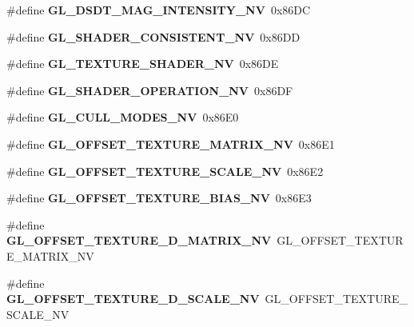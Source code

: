 \begin{DoxyCompactItemize}
\item 
\#define {\bfseries G\+L\+\_\+\+D\+S\+D\+T\+\_\+\+M\+A\+G\+\_\+\+I\+N\+T\+E\+N\+S\+I\+T\+Y\+\_\+\+N\+V}~0x86\+D\+C\label{_s_d_l__opengl_8h_a4ee6f5fea554ca6bdd4c64cc212633a6}

\item 
\#define {\bfseries G\+L\+\_\+\+S\+H\+A\+D\+E\+R\+\_\+\+C\+O\+N\+S\+I\+S\+T\+E\+N\+T\+\_\+\+N\+V}~0x86\+D\+D\label{_s_d_l__opengl_8h_a057a82389278a1d89e69858e8e22dcfa}

\item 
\#define {\bfseries G\+L\+\_\+\+T\+E\+X\+T\+U\+R\+E\+\_\+\+S\+H\+A\+D\+E\+R\+\_\+\+N\+V}~0x86\+D\+E\label{_s_d_l__opengl_8h_a53dd4e08237db42007aafcc639c83b33}

\item 
\#define {\bfseries G\+L\+\_\+\+S\+H\+A\+D\+E\+R\+\_\+\+O\+P\+E\+R\+A\+T\+I\+O\+N\+\_\+\+N\+V}~0x86\+D\+F\label{_s_d_l__opengl_8h_ae6e250a9d3b57ca1c7c3feade2f28899}

\item 
\#define {\bfseries G\+L\+\_\+\+C\+U\+L\+L\+\_\+\+M\+O\+D\+E\+S\+\_\+\+N\+V}~0x86\+E0\label{_s_d_l__opengl_8h_abe95e67754b4eb6a33d3303dcdea7814}

\item 
\#define {\bfseries G\+L\+\_\+\+O\+F\+F\+S\+E\+T\+\_\+\+T\+E\+X\+T\+U\+R\+E\+\_\+\+M\+A\+T\+R\+I\+X\+\_\+\+N\+V}~0x86\+E1\label{_s_d_l__opengl_8h_a4ef75b7d70365dc490a4cd3e5e6d979a}

\item 
\#define {\bfseries G\+L\+\_\+\+O\+F\+F\+S\+E\+T\+\_\+\+T\+E\+X\+T\+U\+R\+E\+\_\+\+S\+C\+A\+L\+E\+\_\+\+N\+V}~0x86\+E2\label{_s_d_l__opengl_8h_a9f16d4d5e18720bbf9f22f271f10f00f}

\item 
\#define {\bfseries G\+L\+\_\+\+O\+F\+F\+S\+E\+T\+\_\+\+T\+E\+X\+T\+U\+R\+E\+\_\+\+B\+I\+A\+S\+\_\+\+N\+V}~0x86\+E3\label{_s_d_l__opengl_8h_a5e6ec56fcbbceedb60992db867b63fe2}

\item 
\#define {\bfseries G\+L\+\_\+\+O\+F\+F\+S\+E\+T\+\_\+\+T\+E\+X\+T\+U\+R\+E\+\_\+D\+\_\+\+M\+A\+T\+R\+I\+X\+\_\+\+N\+V}~G\+L\+\_\+\+O\+F\+F\+S\+E\+T\+\_\+\+T\+E\+X\+T\+U\+R\+E\+\_\+\+M\+A\+T\+R\+I\+X\+\_\+\+N\+V\label{_s_d_l__opengl_8h_a8f1c744e38444eccbd3b0468db93500c}

\item 
\#define {\bfseries G\+L\+\_\+\+O\+F\+F\+S\+E\+T\+\_\+\+T\+E\+X\+T\+U\+R\+E\+\_\+D\+\_\+\+S\+C\+A\+L\+E\+\_\+\+N\+V}~G\+L\+\_\+\+O\+F\+F\+S\+E\+T\+\_\+\+T\+E\+X\+T\+U\+R\+E\+\_\+\+S\+C\+A\+L\+E\+\_\+\+N\+V\label{_s_d_l__opengl_8h_acbf3434a82a2c09271e8b9182a8a024b}


\end{DoxyCompactItemize}
